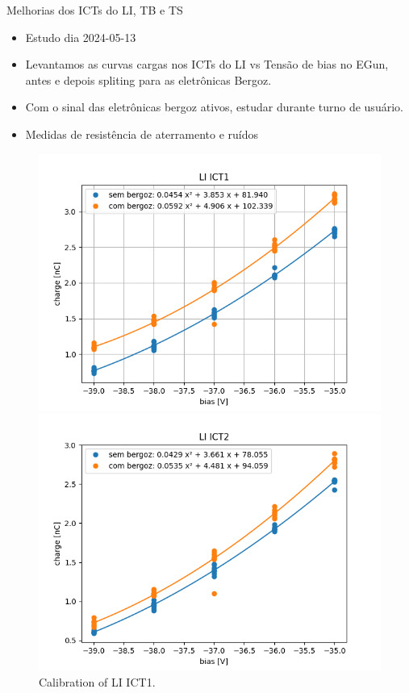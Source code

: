 \documentclass[aspectratio=169]{beamer}            %
\begin{document}
\begin{frame}{Melhorias dos ICTs do LI, TB e TS}
\begin{itemize}
    \setlength\itemsep{1em}
    \item Estudo dia 2024-05-13
    \item Levantamos as curvas cargas nos ICTs do LI vs Tensão de bias no EGun, antes e depois spliting para as eletrônicas Bergoz.
    \item Com o sinal das eletrônicas bergoz ativos, estudar durante turno de usuário.
    \item Medidas de resistência de aterramento e ruídos
\end{itemize}
\begin{figure}[ht]
    \begin{minipage}[b]{0.45\linewidth}
        \centering
        \includegraphics[width=\textwidth]{2024-05-31/figures/li-ict1.png}
        \caption{Calibration of LI ICT1.}
        \label{fig:a}
    \end{minipage}
    \hspace{0.5cm}
    \begin{minipage}[b]{0.45\linewidth}
        \centering
        \includegraphics[width=\textwidth]{2024-05-31/figures/li-ict2.png}

\end{minipage}
\end{figure}
\end{frame}
\end{document}
